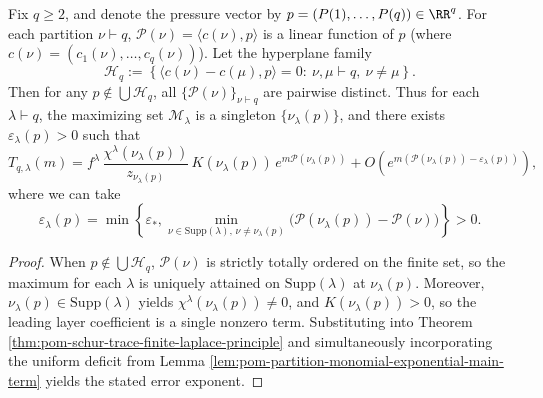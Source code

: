 \begin{theorem}\label{thm:pom-schur-pressure-fan-diagram}
Fix \(q\ge2\), and denote the pressure vector by \(p=(P(1),\dots,P(q))\in\RR^q\).
For each partition \(\nu\vdash q\), \(\mathcal{P}(\nu)=\langle c(\nu),p\rangle\) is a linear function of \(p\) (where \(c(\nu)=(c_1(\nu),\dots,c_q(\nu))\)).
Let the hyperplane family
\[
\mathcal{H}_q
:=
\left\{\langle c(\nu)-c(\mu),p\rangle=0:\ \nu,\mu\vdash q,\ \nu\neq\mu\right\}.
\]
Then for any \(p\notin\bigcup\mathcal{H}_q\), all \(\{\mathcal{P}(\nu)\}_{\nu\vdash q}\) are pairwise distinct.
Thus for each \(\lambda\vdash q\), the maximizing set \(\mathcal{M}_\lambda\) is a singleton \(\{\nu_\lambda(p)\}\), and there exists \(\varepsilon_\lambda(p)>0\) such that
\[
T_{q,\lambda}(m)
=
f^\lambda\,\frac{\chi^\lambda(\nu_\lambda(p))}{z_{\nu_\lambda(p)}}\,K(\nu_\lambda(p))\,
e^{m\mathcal{P}(\nu_\lambda(p))}
+O\!\left(e^{m(\mathcal{P}(\nu_\lambda(p))-\varepsilon_\lambda(p))}\right),
\]
where we can take
\[
\varepsilon_\lambda(p)=\min\!\left\{
\varepsilon_*,
\min_{\nu\in\mathrm{Supp}(\lambda),\,\nu\neq\nu_\lambda(p)}\bigl(\mathcal{P}(\nu_\lambda(p))-\mathcal{P}(\nu)\bigr)
\right\}>0.
\]
\end{theorem}
\begin{proof}
When \(p\notin\bigcup\mathcal{H}_q\), \(\mathcal{P}(\nu)\) is strictly totally ordered on the finite set, so the maximum for each \(\lambda\) is uniquely attained on \(\mathrm{Supp}(\lambda)\) at \(\nu_\lambda(p)\).
Moreover, \(\nu_\lambda(p)\in\mathrm{Supp}(\lambda)\) yields \(\chi^\lambda(\nu_\lambda(p))\neq 0\), and \(K(\nu_\lambda(p))>0\), so the leading layer coefficient is a single nonzero term.
Substituting into Theorem \ref{thm:pom-schur-trace-finite-laplace-principle} and simultaneously incorporating the uniform deficit from Lemma \ref{lem:pom-partition-monomial-exponential-main-term} yields the stated error exponent.
\end{proof}

